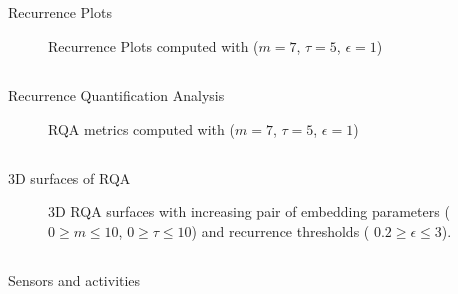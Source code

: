 \subsection{}
{

\begin{frame}{Recurrence Plots}
    \begin{figure}
	\caption{Recurrence Plots computed with ($m=7$, $\tau=5$, $\epsilon=1$)} 
   \end{figure}
	
\end{frame}
}





\subsection{}
{

\begin{frame}{Recurrence Quantification Analysis}
    \begin{figure}
	\caption{RQA metrics computed with ($m=7$, $\tau=5$, $\epsilon=1$)} 
   \end{figure}
	
\end{frame}
}


\subsection{}
{

\begin{frame}{3D surfaces of RQA}
    \begin{figure}
	\small
	\caption{
		3D RQA surfaces 
	with increasing pair of embedding parameters 
	($0 \ge m \le 10$, $0 \ge \tau \le 10$) 
	and recurrence thresholds (  $ 0.2 \ge \epsilon \le 3 $).
	} 
   \end{figure}
	
\end{frame}
}




\subsection{}
{

\begin{frame}{Sensors and activities}
    \begin{figure}
	\caption{} 
   \end{figure}
	
\end{frame}
}



